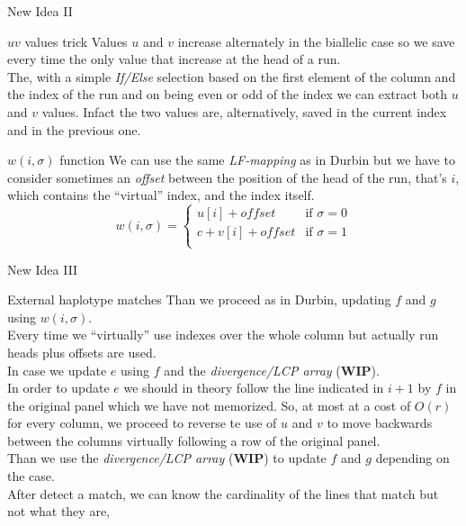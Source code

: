 \documentclass{beamer}
\begin{document}
\begin{frame}{New Idea II}
  \begin{block}{$uv$ values trick}
    Values $u$ and $v$ increase alternately in the biallelic case so we save
    every time the only value that increase at the head of a run.\\
    The, with a simple \textit{If/Else} selection based on the first element of
    the column and the index of the run and on being even or odd of the index we
    can extract both $u$ and $v$ values. Infact the two values are,
    alternatively, saved in the current index and in the previous one.
  \end{block}
  \begin{block}{$w(i,\sigma)$ function}
    We can use the same \textit{LF-mapping} as in Durbin but we have to consider
    sometimes an \textit{offset} between the position of the head of the run,
    that's $i$, which contains the ``virtual'' index, and the index itself.
    \[w(i,\sigma)=
      \begin{cases}
        u[i]+offset&\mbox{if } \sigma=0\\
        c+v[i]+offset&\mbox{if } \sigma=1\\
      \end{cases}
    \]
  \end{block}
\end{frame}
\begin{frame}{New Idea III}
  \begin{block}{External haplotype matches}
    Than we proceed as in Durbin, updating $f$ and $g$ using $w(i,\sigma)$.\\
    Every time we ``virtually'' use indexes over the whole column but actually
    run heads plus offsets are used. \\
    In case we update $e$ using $f$ and the \textit{divergence/LCP array}
    (\textbf{WIP}).\\
    In order to update $e$ we should in theory follow the line indicated in $i +
    1$ by $f$ in the original panel which we have not memorized. So, at most at
    a cost of $O(r)$ for every column, we proceed to reverse te use of $u$ and
    $v$ to move backwards between the columns virtually following a row of the
    original panel.\\
    Than we use the \textit{divergence/LCP array} (\textbf{WIP}) to update
    $f$ 
    and $g$ depending on the case.\\
    After detect a match, we can know the cardinality of the lines that match
    but not what they are, 
  \end{block}
\end{frame}
\end{document}
